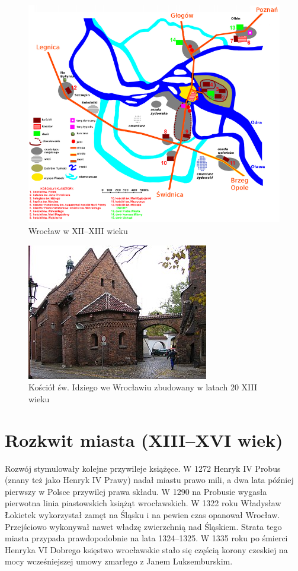 \documentclass{article}
\begin{document}
\begin{figure}[htbp!]
\centering
\includegraphics[scale=0.5]{1.png}
\caption{Wrocław w XII–XIII wieku}
\label{fig:1}
\end{figure}

\begin{figure}[htbp!]
\centering
\includegraphics[scale=0.9]{2.jpg}
\caption{Kościół św. Idziego we Wrocławiu zbudowany w latach 20 XIII wieku}
\label{fig:2}
\end{figure}

\newpage
\section{Rozkwit miasta (XIII–XVI wiek)}

Rozwój stymulowały kolejne przywileje książęce. W 1272 Henryk IV Probus (znany też jako Henryk IV Prawy) nadał miastu prawo mili, a dwa lata później pierwszy w Polsce przywilej prawa składu. W 1290 na Probusie wygasła pierwotna linia piastowskich książąt wrocławskich. W 1322 roku Władysław Łokietek wykorzystał zamęt na Śląsku i na pewien czas opanował Wrocław. Przejściowo wykonywał nawet władzę zwierzchnią nad Śląskiem. Strata tego miasta przypada prawdopodobnie na lata 1324–1325. W 1335 roku po śmierci Henryka VI Dobrego księstwo wrocławskie stało się częścią korony czeskiej na mocy wcześniejszej umowy zmarłego z Janem Luksemburskim.
\end{document}
